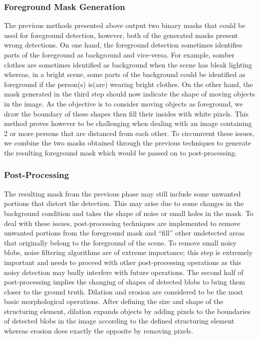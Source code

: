 \subsubsection{Foreground Mask Generation}
The previous methods presented above output two binary masks that could be used for foreground detection, however, both of the generated masks present wrong detections. On one hand, the foreground detection sometimes identifies parts of the foreground as background and vice-versa. For example, somber clothes are sometimes identified as background when the scene has bleak lighting whereas, in a bright scene, some parts of the background could be identified as foreground if the person(s) is(are) wearing bright clothes. On the other hand, the mask generated in the third step should now indicate the shape of moving objects in the image. As the objective is to consider moving objects as foreground, we draw the boundary of these shapes then fill their insides with white pixels. This method proves however to be challenging when dealing with an image containing 2 or more persons that are distanced from each other. To circumvent these issues, we combine the two masks obtained through the previous techniques to generate the resulting foreground mask which would be passed on to post-processing.     
\subsubsection{Post-Processing}
The resulting mask from the previous phase may still include some unwanted portions that distort the detection. This may arise due to some changes in the background condition and takes the shape of noise or small holes in the mask. To deal with these issues, post-processing techniques are implemented to remove unwanted portions from the foreground mask and “fill” other undetected areas that originally belong to the foreground of the scene. To remove small noisy blobs, noise filtering algorithms are of extreme importance; this step is extremely important and needs to proceed with other post-processing operations as this noisy detection may badly interfere with future operations.  The second half of post-processing implies the changing of shapes of detected blobs to bring them closer to the ground truth. Dilation and erosion are considered to be the most basic morphological operations. After defining the size and shape of the structuring element, dilation expands objects by adding pixels to the boundaries of detected blobs in the image according to the defined structuring element whereas erosion does exactly the opposite by removing pixels.  
